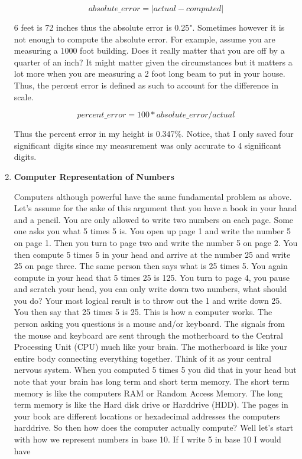 \begin{enumerate}
    \begin{equation}
      absolute\_error = |actual - computed|
    \end{equation}

    6 feet is 72 inches thus the absolute error is 0.25". Sometimes
    however it is not enough to compute the absolute error. For
    example, assume you are measuring a 1000 foot building. Does it
    really matter that you are off by a quarter of an inch? It might
    matter given the circumstances but it matters a lot more when you
    are measuring a 2 foot long beam to put in your house. Thus, the
    percent error is defined as such to account for the difference in
    scale.
    
    \begin{equation}
      percent\_error = 100*absolute\_error/actual
    \end{equation}

    Thus the percent error in my height is 0.347\%. Notice, that I only
    saved four significant digits since my measurement was only
    accurate to 4 significant digits. 

  \item {\bf Computer Representation of Numbers}
  
    Computers although powerful have the same fundamental problem as
    above. Let's assume for the sake of this argument that you have a
    book in your hand and a pencil. You are only allowed to write two
    numbers on each page. Some one asks you what 5 times 5 is. You
    open up page 1 and write the number 5 on page 1. Then you turn to
    page two and write the number 5 on page 2. You then compute 5
    times 5 in your head and arrive at the number 25 and write 25 on
    page three. The same person then says what is 25 times 5. You
    again compute in your head that 5 times 25 is 125. You turn to
    page 4, you pause and scratch your head, you can only write down
    two numbers, what should you do? Your most logical result is to
    throw out the 1 and write down 25. You then say that 25 times 5 is
    25. This is how a computer works. The person asking you questions
    is a mouse and/or keyboard. The signals from the mouse and
    keyboard are sent through the motherboard to the Central
    Processing Unit (CPU) much like your brain. The motherboard is
    like your entire body connecting everything together. Think of it
    as your central nervous system. When you computed 5 times 5 you
    did that in your head but note that your brain has long term and
    short term memory. The short term memory is like the computers RAM
    or Random Access Memory. The long term memory is like the Hard
    disk drive or Harddrive (HDD). The pages in your book are
    different locations or hexadecimal addresses the computers
    harddrive. So then how does the computer actually compute? Well
    let's start with how we represent numbers in base 10. If I write
    5 in base 10 I would have


\end{enumerate}
